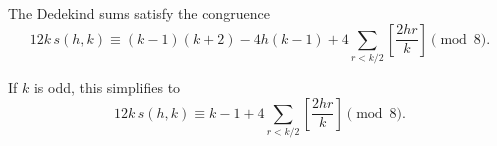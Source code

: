 The Dedekind sums satisfy the congruence
$$12k\,s(h, k) \equiv (k - 1)(k + 2) - 4h(k - 1) + 4 \sum_{r < k/2} \left[ \frac{2hr}{k} \right] \pmod{8}.$$

If $k$ is odd, this simplifies to
$$12k\,s(h, k) \equiv k - 1 + 4 \sum_{r < k/2} \left[ \frac{2hr}{k} \right] \pmod{8}.$$
